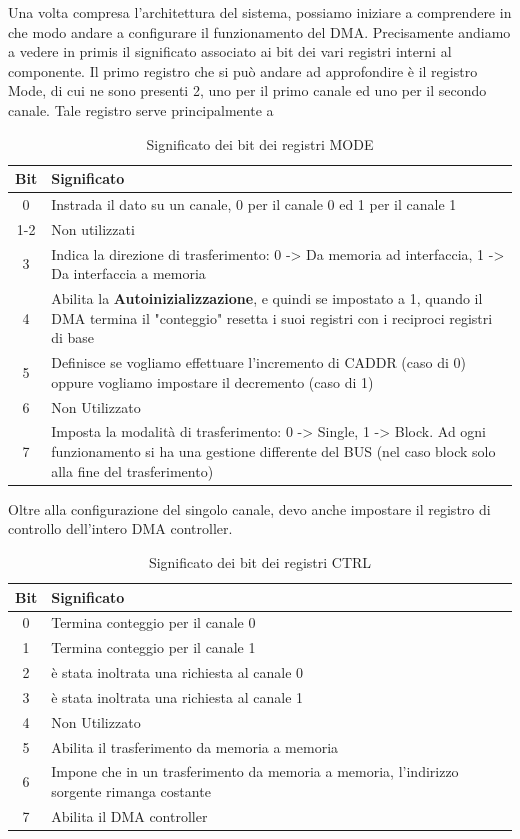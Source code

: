 Una volta compresa l'architettura del sistema, possiamo iniziare a comprendere in che modo andare a configurare il funzionamento del  DMA. Precisamente andiamo a vedere in primis il significato associato ai bit dei vari registri interni al componente.
Il primo registro che si può andare ad approfondire è il registro Mode, di cui ne sono presenti 2, uno per il primo canale ed uno per il secondo canale. Tale registro serve principalmente a 

\begin{table}[h]
    \centering
    \begin{tabular}{|c|p{11cm}|}
    \hline
    \textbf{Bit} & \textbf{Significato} \\
    \hline
    0 & Instrada il dato su un canale, 0 per il canale 0 ed 1 per il canale 1 \\
    1-2 & Non utilizzati \\
    3 & Indica la direzione di trasferimento: 0 -> Da memoria ad interfaccia, 1 -> Da interfaccia a memoria \\
    4 & Abilita la \textbf{Autoinizializzazione}, e quindi se impostato a 1, quando il DMA termina il "conteggio" resetta i suoi registri con i reciproci registri di base \\
    5 & Definisce se vogliamo effettuare l'incremento di CADDR (caso di 0) oppure vogliamo impostare il decremento (caso di 1) \\
    6 & Non Utilizzato \\
    7 & Imposta la modalità di trasferimento: 0 -> Single, 1 -> Block. Ad ogni funzionamento si ha una gestione differente del BUS (nel caso block solo alla fine del trasferimento) \\
    \hline
    \end{tabular}
    \caption{Significato dei bit dei registri MODE}\label{tab:MODE-8237}
\end{table}

Oltre alla configurazione del singolo canale, devo anche impostare il registro di controllo dell'intero DMA controller.
\begin{table}[h]
    \centering
    \begin{tabular}{|c|p{11cm}|}
    \hline
    \textbf{Bit} & \textbf{Significato} \\
    \hline
    0 & Termina conteggio per il canale 0 \\
    1 & Termina conteggio per il canale 1 \\
    2 & è stata inoltrata una richiesta al canale 0 \\
    3 & è stata inoltrata una richiesta al canale 1 \\
    4 & Non Utilizzato \\
    5 & Abilita il trasferimento da memoria a memoria \\
    6 & Impone che in un trasferimento da memoria a memoria, l'indirizzo sorgente rimanga costante \\
    7 & Abilita il DMA controller \\
    \hline
    \end{tabular}
    \caption{Significato dei bit dei registri CTRL}\label{tab:CTRL-8237}
\end{table}

